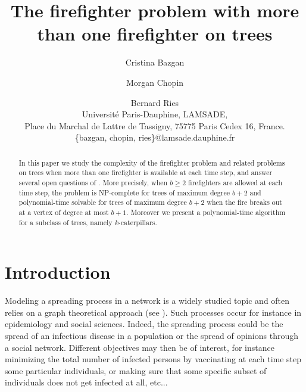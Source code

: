 \documentclass[10pt]{article}
\begin{document}
\newcommand\thetitle{The firefighter problem with more than one firefighter on trees}

\title{\textbf{\thetitle}}
\author{Cristina Bazgan \and Morgan Chopin \and Bernard Ries\\
 {\small Universit\'{e} Paris-Dauphine, LAMSADE,}\\
  {\small Place du Marchal de Lattre de Tassigny, 75775 Paris Cedex 16, France.}\\
  {\small \{bazgan, chopin, ries\}@lamsade.dauphine.fr }\\
 }

\date{ }

\maketitle












\begin{abstract}
In this paper we study the complexity of the firefighter
problem and related problems on trees when more than one firefighter is available at each time
step, and answer several open questions of \cite{finbow2009}.
More precisely, when $b \geq 2$ firefighters are allowed at each time step, the problem is NP-complete
for trees of maximum degree $b+2$ and polynomial-time solvable for trees of
maximum degree $b+2$ when the fire breaks out at a vertex of
degree at most $b+1$. Moreover we present a polynomial-time algorithm for a subclass of trees, namely $k$-caterpillars.
\end{abstract}






\section{Introduction}

Modeling a spreading process in a network is a widely studied topic and often relies on a graph theoretical approach (see \cite{chen2008,dreyer2009,finbow2009,kempe2003,ng2008,scott2006}). Such processes occur for instance in epidemiology and social sciences. Indeed, the spreading process could be the spread of an infectious disease in a population 
or the spread of opinions through a social network. Different objectives may then be of interest, for instance minimizing the total number of 
infected persons by vaccinating at each time step some particular individuals, or making sure that some specific subset of individuals does not get infected at all, etc...
\end{document}
